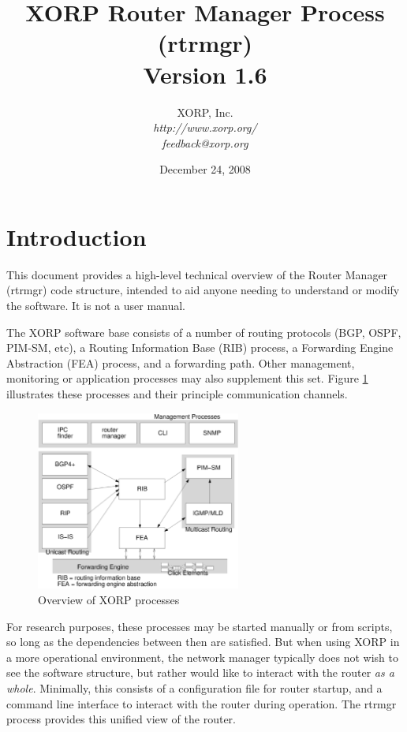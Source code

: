 \documentclass[11pt]{article}
\begin{document}
\title{XORP Router Manager Process (rtrmgr) \\
\vspace{1ex}
Version 1.6}
\author{ XORP, Inc.					\\
         {\it http://www.xorp.org/}			\\
	 {\it feedback@xorp.org}
}
\date{December 24, 2008}

\maketitle


\section{Introduction}

This document provides a high-level technical overview of the Router
Manager (rtrmgr) code structure, intended to aid anyone needing to
understand or modify the software.   It is not a user manual.

The XORP software base consists of a number of routing protocols (BGP,
OSPF, PIM-SM, etc), a Routing Information Base (RIB) process, a
Forwarding Engine Abstraction (FEA) process, and a forwarding path.
Other management, monitoring or application processes may also
supplement this set.  Figure \ref{overview} illustrates these
processes and their principle communication channels.

\begin{figure}[htb]
\centerline{\includegraphics[width=0.6\textwidth]{figs/processes3}}
\vspace{.05in}
\caption{\label{overview}Overview of XORP processes}
\end{figure}

For research purposes, these processes may be started manually or from
scripts, so long as the dependencies between then are satisfied.  But
when using XORP in a more operational environment, the network manager
typically does not wish to see the software structure, but rather
would like to interact with the router {\it as a whole}.  Minimally, this
consists of a configuration file for router startup, and a command
line interface to interact with the router during operation.  The
rtrmgr process provides this unified view of the router.
\end{document}
